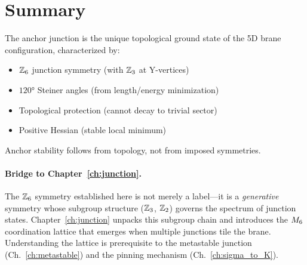 \section{Summary}
\label{sec:anchor:summary}

\begin{resultbox}
    The anchor junction is the unique topological ground state of the 5D brane configuration,
    characterized by:
    \begin{itemize}
        \item $\mathbb{Z}_6$ junction symmetry (with $\mathbb{Z}_3$ at Y-vertices)
        \item $120°$ Steiner angles (from length/energy minimization)
        \item Topological protection (cannot decay to trivial sector)
        \item Positive Hessian (stable local minimum)
    \end{itemize}

    Anchor stability follows from topology, not from imposed symmetries.
\end{resultbox}

\paragraph{Bridge to Chapter~\ref{ch:junction}.}
The $\mathbb{Z}_6$ symmetry established here is not merely a label---it is a
\emph{generative} symmetry whose subgroup structure ($\mathbb{Z}_3$, $\mathbb{Z}_2$)
governs the spectrum of junction states. Chapter~\ref{ch:junction} unpacks
this subgroup chain and introduces the $M_6$ coordination lattice that
emerges when multiple junctions tile the brane. Understanding the lattice
is prerequisite to the metastable junction (Ch.~\ref{ch:metastable}) and
the pinning mechanism (Ch.~\ref{ch:sigma_to_K}).
